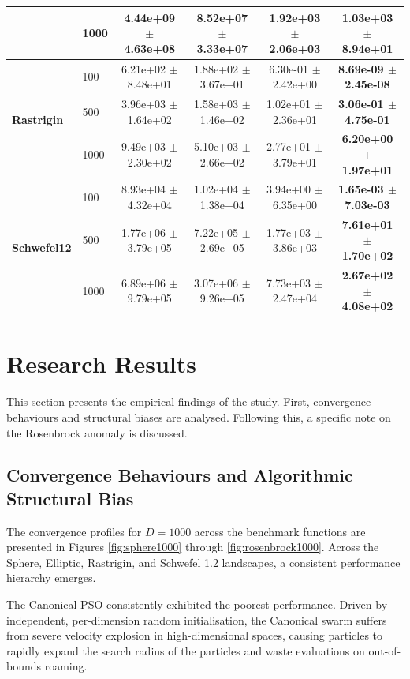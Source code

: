 \documentclass[conference]{IEEEtran}
\begin{document}
\begin{table}[htbp]
\begin{tabular}{llcccc}
 & 1000 & 4.44e+09 $\pm$ 4.63e+08 & 8.52e+07 $\pm$ 3.33e+07 & 1.92e+03 $\pm$ 2.06e+03 & \textbf{1.03e+03 $\pm$ 8.94e+01} \\
\midrule
\multirow{3}{*}{\textbf{Rastrigin}} & 100 & 6.21e+02 $\pm$ 8.48e+01 & 1.88e+02 $\pm$ 3.67e+01 & 6.30e-01 $\pm$ 2.42e+00 & \textbf{8.69e-09 $\pm$ 2.45e-08} \\
 & 500 & 3.96e+03 $\pm$ 1.64e+02 & 1.58e+03 $\pm$ 1.46e+02 & 1.02e+01 $\pm$ 2.36e+01 & \textbf{3.06e-01 $\pm$ 4.75e-01} \\
 & 1000 & 9.49e+03 $\pm$ 2.30e+02 & 5.10e+03 $\pm$ 2.66e+02 & 2.77e+01 $\pm$ 3.79e+01 & \textbf{6.20e+00 $\pm$ 1.97e+01} \\
\midrule
\multirow{3}{*}{\textbf{Schwefel12}} & 100 & 8.93e+04 $\pm$ 4.32e+04 & 1.02e+04 $\pm$ 1.38e+04 & 3.94e+00 $\pm$ 6.35e+00 & \textbf{1.65e-03 $\pm$ 7.03e-03} \\
 & 500 & 1.77e+06 $\pm$ 3.79e+05 & 7.22e+05 $\pm$ 2.69e+05 & 1.77e+03 $\pm$ 3.86e+03 & \textbf{7.61e+01 $\pm$ 1.70e+02} \\
 & 1000 & 6.89e+06 $\pm$ 9.79e+05 & 3.07e+06 $\pm$ 9.26e+05 & 7.73e+03 $\pm$ 2.47e+04 & \textbf{2.67e+02 $\pm$ 4.08e+02} \\
\bottomrule
\end{tabular}
\end{table}


\section{Research Results}
This section presents the empirical findings of the study. First, convergence behaviours 
and structural biases are analysed. Following this, a specific note on the Rosenbrock anomaly is discussed.

\subsection{Convergence Behaviours and Algorithmic Structural Bias}
The convergence profiles for $D=1000$ across the benchmark functions are presented in Figures \ref{fig:sphere1000} 
through \ref{fig:rosenbrock1000}. Across the Sphere, Elliptic, Rastrigin, and Schwefel 1.2 landscapes, a consistent 
performance hierarchy emerges.

The Canonical PSO consistently exhibited the poorest performance. Driven by independent, per-dimension random 
initialisation, the Canonical swarm suffers from severe velocity explosion in high-dimensional spaces, causing 
particles to rapidly expand the search radius of the particles and waste evaluations on out-of-bounds roaming. 
\end{document}
